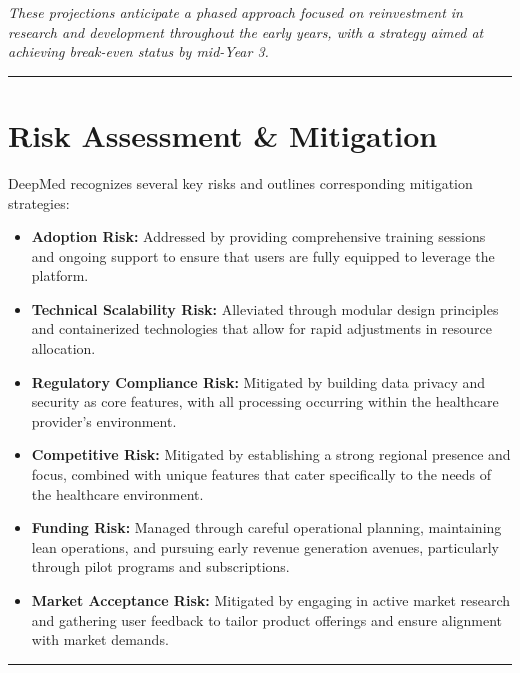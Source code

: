 \documentclass[11pt,a4paper]{article}
\begin{document}
\textit{These projections anticipate a phased approach focused on reinvestment in research and development throughout the early years, with a strategy aimed at achieving break-even status by mid-Year 3.}

\bigskip\hrule\bigskip

\section{Risk Assessment \& Mitigation}
DeepMed recognizes several key risks and outlines corresponding mitigation strategies:
\begin{itemize}
  \item \textbf{Adoption Risk:} Addressed by providing comprehensive training sessions and ongoing support to ensure that users are fully equipped to leverage the platform.
  \item \textbf{Technical Scalability Risk:} Alleviated through modular design principles and containerized technologies that allow for rapid adjustments in resource allocation.
  \item \textbf{Regulatory Compliance Risk:} Mitigated by building data privacy and security as core features, with all processing occurring within the healthcare provider's environment.
  \item \textbf{Competitive Risk:} Mitigated by establishing a strong regional presence and focus, combined with unique features that cater specifically to the needs of the healthcare environment.
  \item \textbf{Funding Risk:} Managed through careful operational planning, maintaining lean operations, and pursuing early revenue generation avenues, particularly through pilot programs and subscriptions.
  \item \textbf{Market Acceptance Risk:} Mitigated by engaging in active market research and gathering user feedback to tailor product offerings and ensure alignment with market demands.
\end{itemize}

\bigskip\hrule\bigskip
\end{document}
